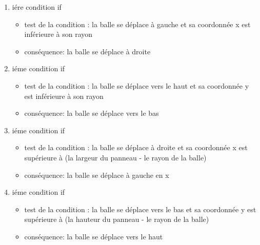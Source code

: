 \documentclass{article}
\begin{document}
\begin{enumerate}
\item i\'ere condition if
\begin{itemize}
\item test de la condition : la balle se déplace à gauche et sa coordonnée x est inférieure à son rayon
\item conséquence: la balle se déplace à droite
\end{itemize}

\item i\'eme condition if
\begin{itemize}
\item test de la condition : la balle se déplace vers le haut et sa coordonnée y est inférieure à son rayon
\item conséquence: la balle se déplace vers le bas
\end{itemize}\newpage

\item i\'eme condition if
\begin{itemize}
\item test de la condition : la balle se déplace à droite et sa coordonnée x est supérieure à (la largeur du panneau - le rayon de la balle)
\item conséquence: la balle se déplace à gauche en x
\end{itemize}

\item i\'eme condition if
\begin{itemize}
\item test de la condition : la balle se déplace vers le bas et sa coordonnée y est supérieure à (la hauteur du panneau - le rayon de la balle)
\item conséquence: la balle se déplace vers le haut
\end{itemize}

\end{enumerate}
\end{document}
